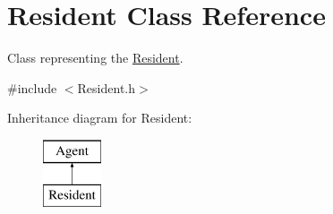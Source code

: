 \hypertarget{classResident}{\section{Resident Class Reference}
\label{classResident}
}


Class representing the \hyperlink{classResident}{Resident}.  




{\ttfamily \#include $<$Resident.\-h$>$}

Inheritance diagram for Resident\-:\begin{figure}[H]
\begin{center}
\leavevmode
\includegraphics[height=2.000000cm]{classResident}
\end{center}
\end{figure}
